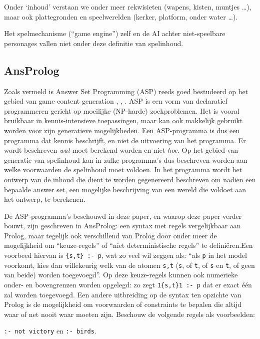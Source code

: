 \documentclass{article}
\begin{document}
	Onder `inhoud' verstaan we onder meer rekwisieten (wapens, kisten, muntjes \dots), maar ook plattegronden en speelwerelden (kerker, platform, onder water \dots).
	
	 Het spelmechanisme (``game engine'') zelf en de AI achter niet-speelbare personages vallen niet onder deze definitie van spelinhoud.
	\subsection{AnsProlog}
Zoals vermeld is Answer Set Programming (ASP) reeds goed bestudeerd op het gebied van game content generation \cite{togelius2015chapter8}, \cite{togelius_guest}, \cite{journals/tciaig/SmithWM11}. ASP is een vorm van declaratief programmeren gericht op moeilijke (NP-harde) zoekproblemen. Het is vooral bruikbaar in kennis-intensieve toepassingen, maar kan ook makkelijk gebruikt worden voor zijn generatieve mogelijkheden. Een ASP-programma is dus een programma dat kennis beschrijft, en niet de uitvoering van het programma. Er wordt beschreven \textit{wat} moet berekend worden en niet \textit{hoe}. Op het gebied van generatie van spelinhoud kan in zulke programma's dus beschreven worden aan welke voorwaarden de spelinhoud moet voldoen. In het programma wordt het ontwerp van de inhoud die dient te worden gegenereerd beschreven om nadien een bepaalde answer set, een mogelijke beschrijving van een wereld die voldoet aan het ontwerp, te berekenen.

De ASP-programma's beschouwd in deze paper, en waarop deze paper verder bouwt, zijn geschreven in AnsProlog: een syntax met regels vergelijkbaar aan Prolog, maar tegelijk ook verschillend van Prolog door onder meer de mogelijkheid om ``keuze-regels'' of ``niet deterministische regels'' te defini\"eren.Een voorbeed hiervan is \texttt{\{s,t\} :- p}, wat zo veel wil zeggen als: ``als \texttt{p} in het model voorkomt, kies dan willekeurig welk van de atomen \texttt{s,t} (\texttt{s}, of \texttt{t}, of \texttt{s} en \texttt{t}, of geen van beide) worden toegevoegd''. Op deze keuze-regels kunnen ook numerieke onder- en bovengrenzen worden opgelegd: zo zegt \texttt{1\{s,t\}1 :- p} dat er exact \'e\'en zal worden toegevoegd. Een andere uitbreiding op de syntax ten opzichte van Prolog is de mogelijkheid om voorwaarden of constraints te bepalen die altijd waar of net nooit waar moeten zijn. Beschouw de volgende regels als voorbeelden:

\begin{center}
\texttt{:- not victory} en \texttt{:- birds}.
\end{center}
\end{document}

